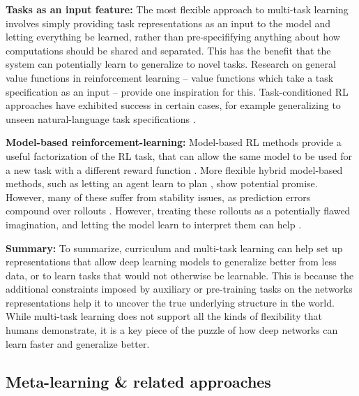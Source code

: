 \textbf{Tasks as an input feature:} The most flexible approach to multi-task learning involves simply providing task representations as an input to the model and letting everything be learned, rather than pre-specififying anything about how computations should be shared and separated. This has the benefit that the system can potentially learn to generalize to novel tasks. Research on general value functions in reinforcement learning \citep{Sutton2011} -- value functions which take a task specification as an input -- provide one inspiration for this. Task-conditioned RL approaches have exhibited success in certain cases, for example generalizing to unseen natural-language task specifications \citep{Hermann2017}.  \par

\textbf{Model-based reinforcement-learning:} Model-based RL methods provide a useful factorization of the RL task, that can allow the same model to be used for a new task with a different reward function \citep[e.g.][]{Laroche2017}. More flexible hybrid model-based methods, such as letting an agent learn to plan \citep{Tamar2017}, show potential promise. However, many of these suffer from stability issues, as prediction errors compound over rollouts \citep{Talvitie2014}. However, treating these rollouts as a potentially flawed imagination, and letting the model learn to interpret them can help \citep{Racaniere2017}. \par

\textbf{Summary:} To summarize, curriculum and multi-task learning can help set up representations that allow deep learning models to generalize better from less data, or to learn tasks that would not otherwise be learnable. This is because the additional constraints imposed by auxiliary or pre-training tasks on the networks representations help it to uncover the true underlying structure in the world. While multi-task learning does not support all the kinds of flexibility that humans demonstrate, it is a key piece of the puzzle of how deep networks can learn faster and generalize better. \par

\subsection{Meta-learning \& related approaches} \label{meta_learning_sec}

